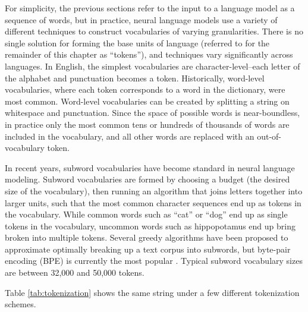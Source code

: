 For simplicity, the previous sections refer to the input to a language model as a sequence of words, but in practice, neural language models use a variety of different techniques to construct vocabularies of varying granularities.
There is no single solution for forming the base units of language (referred to for the remainder of this chapter as ``tokens''), and techniques vary significantly across languages.
In English, the simplest vocabularies are character-level--each letter of the alphabet and punctuation becomes a token.
Historically, word-level vocabularies, where each token corresponds to a word in the dictionary, were most common.
Word-level vocabularies can be created by splitting a string on whitespace and punctuation.
Since the space of possible words is near-boundless, in practice only the most common tens or hundreds of thousands of words are included in the vocabulary, and all other words are replaced with an out-of-vocabulary token.

In recent years, subword vocabularies have become standard in neural language modeling.
Subword vocabularies are formed by choosing a budget (the desired size of the vocabulary), then running an algorithm that joins letters together into larger units, such that the most common character sequences end up as tokens in the vocabulary.
While common words such as ``cat'' or ``dog'' end up as single tokens in the vocabulary, uncommon words such as hippopotamus end up bring broken into multiple tokens.
Several greedy algorithms have been proposed to approximate optimally breaking up a text corpus into subwords, but byte-pair encoding (BPE) is currently the most popular \citep{sennrich2016neural}.
Typical subword vocabulary sizes are between 32,000 and 50,000 tokens.

Table \ref{tab:tokenization} shows the same string under a few different tokenization schemes.

